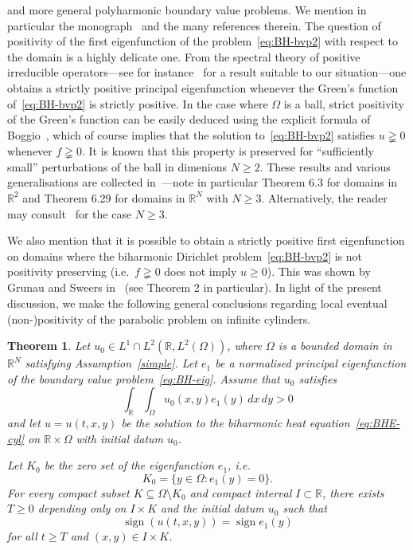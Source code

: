 \documentclass[a4paper, reqno]{amsart}
\numberwithin{equation}{section}
\theoremstyle{plain}
\newtheorem{theorem}{Theorem}[section]
\theoremstyle{definition}
\theoremstyle{remark}
\DeclareMathOperator{\sgn}{sign}
\newcommand{\RR}{\mathbb{R}}
\begin{document}
and more general polyharmonic boundary value problems. We mention in particular the monograph~\cite{GGS} and the many references therein. The question of positivity of the first eigenfunction of the problem~\eqref{eq:BH-bvp2} with respect to the domain is a highly delicate one. From the spectral theory of positive irreducible operators---see for instance~\cite[Theorem 43.8]{Zaa} for a result suitable to our situation---one obtains a strictly positive principal eigenfunction whenever the Green's function of~\eqref{eq:BH-bvp2} is strictly positive. In the case where $\Omega$ is a ball, strict positivity of the Green's function can be easily deduced using the explicit formula of Boggio~\cite[Section 4.1]{GGS}, which of course implies that the solution to~\eqref{eq:BH-bvp2} satisfies $u \gneqq 0$ whenever $f \gneqq 0$. It is known that this property is preserved for ``sufficiently small'' perturbations of the ball in dimenions $N \geq 2$. These results and various generalisations are collected in~\cite[Chapter~6]{GGS}---note in particular Theorem 6.3 for domains in $\RR^2$ and Theorem 6.29 for domains in $\RR^N$ with $N \geq 3$. Alternatively, the reader may consult~\cite[Theorem 2]{GR10} for the case $N \geq 3$.

We also mention that it is possible to obtain a strictly positive first eigenfunction on domains where the biharmonic Dirichlet problem~\eqref{eq:BH-bvp2} is not positivity preserving (i.e.\ $f \gneqq 0$ does not imply $u \geq 0$). This was shown by Grunau and Sweers in~\cite{GS99} (see Theorem 2 in particular). In light of the present discussion, we make the following general conclusions regarding local eventual (non-)positivity of the parabolic problem on infinite cylinders.

\begin{theorem}
  \label{thm:LEP-cyl}
  Let $u_0 \in L^1 \cap L^2(\RR, L^2(\Omega))$, where $\Omega$ is a bounded domain in $\RR^N$ satisfying Assumption~\ref{simple}. Let $e_1$ be a normalised principal eigenfunction of the boundary value problem~\eqref{eq:BH-eig}. Assume that $u_0$ satisfies
  \begin{equation}
    \label{eq:u0-pos-mass-cyl}
    \int_\RR \int_\Omega u_0(x,y) e_1(y) \,dx \,dy > 0
  \end{equation}
  and let $u = u(t, x, y)$ be the solution to the biharmonic heat equation~\eqref{eq:BHE-cyl} on $\RR \times \Omega$ with initial datum $u_0$.

  Let $K_0$ be the zero set of the eigenfunction $e_1$, i.e.
  \begin{equation*}
    K_0 = \{ y \in \Omega\colon e_1(y) = 0 \}.
  \end{equation*}
  For every compact subset $K \subseteq \Omega \setminus K_0$ and compact interval $I \subset \RR$, there exists $T \geq 0$ depending only on $I \times K$ and the initial datum $u_0$ such that
  \begin{equation}
    \label{eq:LEP-cyl}
    \sgn(u(t,x,y)) = \sgn e_1(y)
  \end{equation}
  for all $t \geq T$ and $(x,y) \in I \times K$.
\end{theorem}
\end{document}
